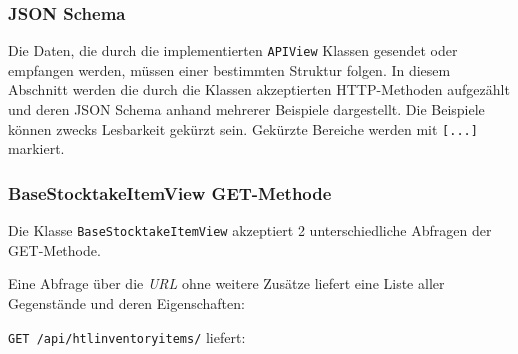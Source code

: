 \hypertarget{json-schema}{%
\subsubsection{JSON Schema}\label{json-schema}}

Die Daten, die durch die implementierten \texttt{APIView} Klassen
gesendet oder empfangen werden, müssen einer bestimmten Struktur folgen.
In diesem Abschnitt werden die durch die Klassen akzeptierten
HTTP-Methoden \cite{rest-http-methods} aufgezählt und deren JSON Schema
anhand mehrerer Beispiele dargestellt. Die Beispiele können zwecks
Lesbarkeit gekürzt sein. Gekürzte Bereiche werden mit \texttt{{[}...{]}}
markiert.

\subsubsection*{BaseStocktakeItemView GET-Methode}

Die Klasse \texttt{BaseStocktakeItemView} akzeptiert 2 unterschiedliche
Abfragen der GET-Methode.

Eine Abfrage über die \emph{URL}
 ohne weitere Zusätze
liefert eine Liste aller Gegenstände und deren Eigenschaften:

\texttt{GET\ /api/htlinventoryitems/} liefert:

\begin{Shaded}
\begin{Highlighting}[]
\FunctionTok{\{}
    \FunctionTok{:} \OtherTok{[}\FunctionTok{\{}
            \FunctionTok{:} \FunctionTok{,}
            \FunctionTok{:} \FunctionTok{,}
            \FunctionTok{:} \FunctionTok{,}
            \FunctionTok{:} \FunctionTok{,}
            \FunctionTok{:} \FunctionTok{,}
            \FunctionTok{:} \FunctionTok{\{}
                \FunctionTok{:} \FunctionTok{,}
                \ErrorTok{[...]}
            \FunctionTok{\},}
            \FunctionTok{:} \OtherTok{[]}
        \FunctionTok{\}}\OtherTok{,}
        \OtherTok{[}\OtherTok{]}
    \OtherTok{]}
\FunctionTok{\}}
\end{Highlighting}
\end{Shaded}

